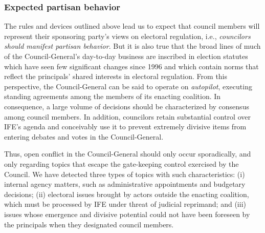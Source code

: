 \documentclass[12 pt, letter]{article}
\begin{document}
\subsubsection{Expected partisan behavior}
The rules and devices outlined above lead us to expect that council members will represent their sponsoring party's views on electoral regulation, i.e., \emph{councilors should manifest partisan behavior}.  But it is also true that the broad lines of much of the Council-General's day-to-day business are inscribed in election statutes which have seen few significant changes since 1996 and which contain norms that reflect the principals' shared interests in electoral regulation.  From this perspective, the Council-General can be said to operate on \emph{autopilot}, executing standing agreements among the members of its enacting coalition.  In consequence, a large volume of decisions should be characterized by consensus among council members.  In addition, councilors retain substantial control over IFE's agenda and conceivably use it to prevent extremely divisive items from entering debates and votes in the Council-General.

Thus, open conflict in the Council-General should only occur sporadically, and only regarding topics that escape the gate-keeping control exercised by the Council. We have detected three types of topics with such characteristics: (i) internal agency matters, such as administrative appointments and budgetary decisions; (ii) electoral issues brought by actors outside the enacting coalition, which must be processed by IFE under threat of judicial reprimand; and (iii) issues whose emergence and divisive potential could not have been foreseen by the principals when they designated council members.
\end{document}
